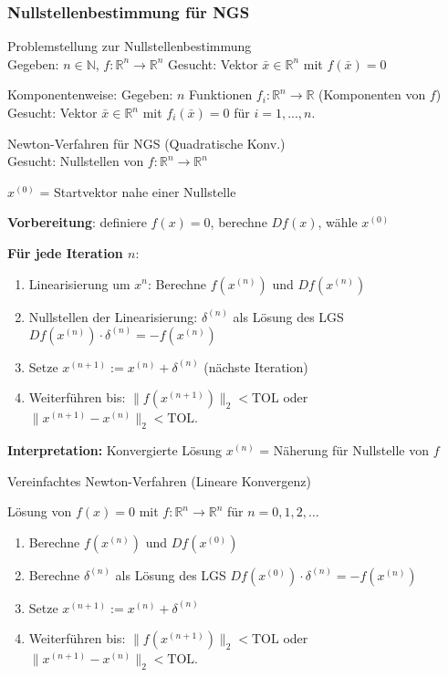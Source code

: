 \raggedcolumns

\subsubsection{Nullstellenbestimmung für NGS}

\begin{definition}{Problemstellung zur Nullstellenbestimmung}\\
Gegeben: $n \in \mathbb{N}$, $f: \mathbb{R}^n \rightarrow \mathbb{R}^n$ Gesucht: Vektor $\bar{x} \in \mathbb{R}^n$ mit $f(\bar{x}) = 0$

Komponentenweise: Gegeben: $n$ Funktionen $f_i: \mathbb{R}^n \rightarrow \mathbb{R}$ (Komponenten von $f$) Gesucht: Vektor $\bar{x} \in \mathbb{R}^n$ mit $f_i(\bar{x}) = 0$ für $i = 1, ..., n$.
\end{definition}

\begin{KR}{Newton-Verfahren für NGS} \small{(Quadratische Konv.)}\\
    \normalsize
    Gesucht: Nullstellen von $f: \mathbb{R}^n \rightarrow \mathbb{R}^n$
    
    $x^{(0)}$ = Startvektor nahe einer Nullstelle

    \textbf{Vorbereitung}: definiere $f(x) = 0$, berechne $Df(x)$, wähle $x^{(0)}$

    \textbf{Für jede Iteration $n$}:
    \begin{enumerate}
        \item Linearisierung um $x^{n}$: Berechne $f(x^{(n)})$ und $D f(x^{(n)})$
        \item Nullstellen der Linearisierung: $\delta^{(n)}$ als Lösung des LGS\\
        $Df(x^{(n)}) \cdot \delta^{(n)} = -f(x^{(n)})$
        \item Setze $x^{(n+1)} := x^{(n)} + \delta^{(n)}$ (nächste Iteration)
        \item \small Weiterführen bis: $\|f(x^{(n+1)})\|_2 < \text{TOL}$ oder $\|x^{(n+1)} - x^{(n)}\|_2 < \text{TOL}$.
    \end{enumerate}
    \small
    \textbf{Interpretation:} Konvergierte Lösung $x^{(n)}$ = Näherung für Nullstelle von $f$
\end{KR}

\begin{theorem}{Vereinfachtes Newton-Verfahren} (Lineare Konvergenz)

    Lösung von $f(x)=0$ mit $f: \mathbb{R}^n \rightarrow \mathbb{R}^n$ für $n=0,1,2, \ldots$
    \begin{enumerate}
        \item Berechne $f(x^{(n)})$ und $D f(x^{(0)})$
        \item Berechne $\delta^{(n)}$ als Lösung des LGS $D f(x^{(0)}) \cdot \delta^{(n)}=-f(x^{(n)})$
        \item Setze $x^{(n+1)}:=x^{(n)}+\delta^{(n)}$
        \item \small Weiterführen bis: $\|f(x^{(n+1)})\|_2 < \text{TOL}$ oder $\|x^{(n+1)} - x^{(n)}\|_2 < \text{TOL}$.
    \end{enumerate}
\end{theorem}


